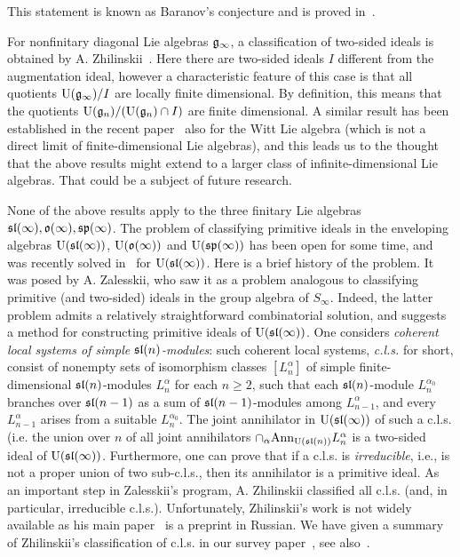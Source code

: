 \documentclass[10pt]{amsart}\oddsidemargin -1mm \evensidemargin -1mm \topmargin -15mm\headheight5mm \headsep 3.5mm \textheight 245mm\textwidth 170mm
\theoremstyle{definition}\newtheorem{theorem}{Theorem}[section]\newtheorem{lemma}[theorem]{Lemma}\newtheorem{remark}[theorem]{Remark}\newtheorem{proposition}[theorem]{Proposition}\newtheorem{corollary}[theorem]{Corollary}\newtheorem{definition}[theorem]{Definition}\newtheorem{Ex}[theorem]{Example}\newtheorem{obs}[theorem]{Observation}\newtheorem{nota}[theorem]{Notation}
\begin{document}
This statement is known as Baranov's conjecture and is proved in~\cite{PP1}. 

For nonfinitary diagonal Lie algebras $\frak g_\infty$, a classification of two-sided ideals is obtained by A. Zhilinskii~\cite{Zh3}. 
Here there are two-sided ideals $I$ different from the augmentation ideal, however a characteristic feature of this case is that all quotients ${\rm U}(\frak g_\infty)/I$ are locally finite dimensional. 
By definition, this means that the quotients ${\rm U}(\frak g_n)/({\rm U}(\frak g_n)\cap I)$ are finite dimensional. 
A similar result has been established in the recent paper~\cite{PeS} also for the Witt Lie algebra (which is not a direct limit of finite-dimensional Lie algebras), and this leads us to the thought that the above results might extend to a larger class  of infinite-dimensional Lie algebras. 
That could be a subject of future research.

None of the above results apply to the three finitary Lie algebras $\frak{sl}(\infty), \frak{o}(\infty), \frak{sp}(\infty)$.
The problem of classifying primitive ideals in the enveloping algebras ${\rm U}(\frak{sl}(\infty))$, ${\rm U}(\frak{o}(\infty))$ and ${\rm U}(\frak{sp}(\infty))$ has been open for some time, and was recently solved in~\cite{PP5} for ${\rm U}(\frak{sl}(\infty))$. 
Here is a brief history of the problem. 
It was posed by A. Zalesskii, who saw it as a problem analogous to classifying primitive (and two-sided) ideals in the group algebra of $S_\infty$. 
Indeed, the latter problem admits a relatively straightforward combinatorial solution, and suggests a method for constructing primitive ideals of ${\rm U}(\frak{sl}(\infty))$. 
One considers {\it coherent local systems of simple $\frak{sl}(n)$-modules}: such coherent local systems, {\it c.l.s.} for short, consist of nonempty sets of isomorphism classes $[L_n^\alpha]$ of simple finite-dimensional $\frak{sl}(n)$-modules $L_n^\alpha$ for each $n\ge2$, such that each $\frak{sl}(n)$-module $L_n^{\alpha_0}$ branches over $\frak{sl}(n-1)$ as a sum of $\frak{sl}(n-1)$-modules among $L_{n-1}^{\alpha}$, and every $L_{n-1}^\alpha$ arises from a suitable $L_n^{\alpha_0}$. 
The joint annihilator in ${\rm U}(\frak{sl}(\infty))$ of such a c.l.s. (i.e. the union over $n$ of all joint annihilators $\cap_\alpha{\rm Ann}_{{\rm U}(\frak{sl}(n))}L_n^\alpha$ is a two-sided ideal of ${\rm U}(\frak{sl}(\infty))$. 
Furthermore, one can prove that if a c.l.s. is {\it irreducible}, i.e., is not a proper union of two sub-c.l.s., then its annihilator is a primitive ideal. 
As an important step in Zalesskii's program, A. Zhilinskii classified all c.l.s. (and, in particular, irreducible c.l.s.). 
Unfortunately, Zhilinskii's work is not widely available as his main paper~\cite{Zh3} is a preprint in Russian. 
We have given a summary of Zhilinskii's classification of c.l.s. in our survey paper~\cite{PP3}, see also~\cite{PP1}.
\end{document}
